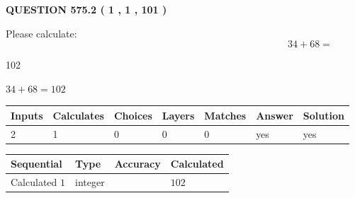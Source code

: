 \documentclass[12pt]{article}
\begin{document}
   
  
\vspace{0.2in}
  
{\textbf{\Large{QUESTION
575.2 
 ( 1 , 1 , 101 )
}}}
  
  
 
Please calculate:
\begin{equation}
34 +  %
68 = \nonumber
\end{equation}
 
 
 
\noindent{}
 
 

102
 
 
\noindent{}
 
 

 
 
 
\noindent{}
 
 

$ %
34 +  %
68=   %
102$
 
 
\noindent{}
 
 

 
   
   
   
   
\noindent\begin{tabular}{|l|l|l|l|l|l|l|}
 \hline
Inputs & Calculates & Choices & Layers & Matches & Answer & Solution \\ \hline
 2  & 
 1  & 
 0
  & 
 0  & 
 0  & 
  yes & 
  yes 
  \\ \hline
 \end{tabular}
   
   
   
   
\noindent{}
   
   
  
  
\noindent\begin{tabular}{|l|l|l|l|}
\hline
 Sequential & Type & Accuracy & Calculated \\ 
\hline
 
 
  Calculated $  1 $ & integer &  & 
  $ 102 $ 
 \\  \hline  
 \end{tabular}
   
\end{document}
